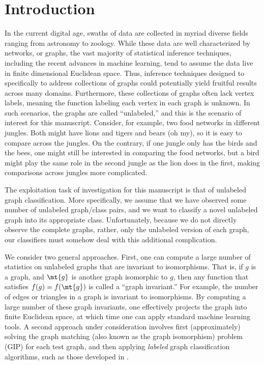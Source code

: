 \section{Introduction}

In the current digital age, swaths of data are collected in myriad diverse fields ranging from astronomy to zoology.  While these data are well characterized by networks, or graphs, the vast majority of statistical inference techniques, including the recent advances in machine learning, tend to assume the data live in finite dimensional Euclidean space.  Thus, inference techniques designed to specifically to address collections of graphs could potentially yield fruitful results across many domains.  Furthermore, these collections of graphs often lack vertex labels, meaning the function labeling each vertex in each graph is unknown.  In such scenarios, the graphs are called ``unlabeled,'' and this is the scenario of interest for this manuscript.  Consider, for example, two food networks in different jungles.  Both might have lions and tigers and bears (oh my), so it is easy to compare across the jungles.  On the contrary, if one jungle only has the birds and the bees, one might still be interested in comparing the food networks, but a bird might play the same role in the second jungle as the lion does in the first, making comparisons across jungles more complicated.


The exploitation task of investigation for this manuscript is that of unlabeled graph classification.  More specifically, we assume that we have observed some number of unlabeled graph/class pairs, and we want to classify a novel unlabeled graph into its appropriate class. Unfortunately, because we do not directly observe the complete graphs, rather, only the unlabeled version of each graph, our classifiers must somehow deal with this additional complication.

We consider two general approaches.  First, one can compute a large number of statistics on unlabeled graphs that are invariant to isomorphisms.  That is, if $g$ is a graph, and $\mt{g}$ is another graph isomorphic to $g$, then any function that satisfies $f(g)=f(\mt{g})$ is called a ``graph invariant.''  For example, the number of edges or triangles in a graph is invariant to isomorphisms.  By computing a large number of these graph invariants, one effectively projects the graph into finite Euclidean space, at which time one can apply standard machine learning tools.  A second approach under consideration involves first (approximately) solving the graph matching (also known as the graph isomorphism) problem (GIP) for each test graph, and then applying \emph{labeled} graph classification algorithms, such as those developed in \cite{VogelsteinPriebe10a}.

